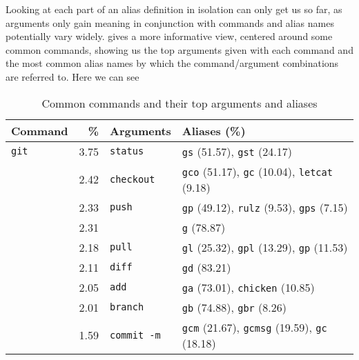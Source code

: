 Looking at each part of an alias definition in isolation can only get us so far, as arguments only gain meaning in conjunction with commands and alias names potentially vary widely.
 gives a more informative view, centered around some common commands, showing us the top arguments given with each command and the most common alias names by which the command/argument combinations are referred to.
Here we can see \TODO

\begin{table*}
    \caption{Common commands and their top arguments and aliases}
    \label{tab:command-summary}
    \begin{tabular}{lrll}
        \toprule
             Command &           \% &                 Arguments &                                                                                 Aliases (\%) \\
        \midrule
          \verb|git| &   \num{3.75} &             \verb|status| &                                  \verb|gs| (\num{51.57}), \verb|gst| (\num{24.17}) \\
                     &   \num{2.42} &           \verb|checkout| & \verb|gco| (\num{51.17}), \verb|gc| (\num{10.04}), \verb|letcat| (\num{9.18}) \\
                     &   \num{2.33} &               \verb|push| &    \verb|gp| (\num{49.12}), \verb|rulz| (\num{9.53}), \verb|gps| (\num{7.15}) \\
                     &   \num{2.31} &                   \verb|| &                                                                  \verb|g| (\num{78.87}) \\
                     &   \num{2.18} &               \verb|pull| &    \verb|gl| (\num{25.32}), \verb|gpl| (\num{13.29}), \verb|gp| (\num{11.53}) \\
                     &   \num{2.11} &               \verb|diff| &                                                                 \verb|gd| (\num{83.21}) \\
                     &   \num{2.05} &                \verb|add| &                              \verb|ga| (\num{73.01}), \verb|chicken| (\num{10.85}) \\
                     &   \num{2.01} &             \verb|branch| &                                   \verb|gb| (\num{74.88}), \verb|gbr| (\num{8.26}) \\
                     &   \num{1.59} &          \verb|commit -m| & \verb|gcm| (\num{21.67}), \verb|gcmsg| (\num{19.59}), \verb|gc| (\num{18.18}) \\

\end{tabular}
\end{table*}
